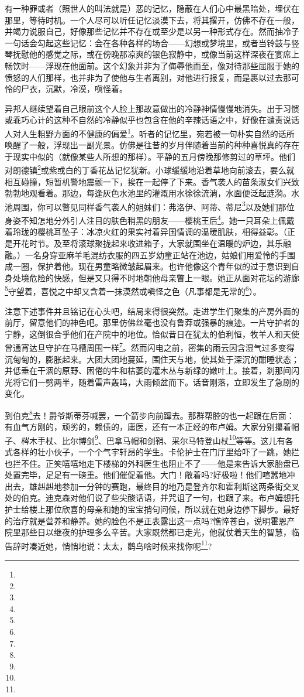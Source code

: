 \par 有一种罪或者（照世人的叫法就是）恶的记忆，隐蔽在人们心中最黑暗处，埋伏在那里，等待时机。一个人尽可以听任记忆淡漠下去，将其撂开，仿佛不存在一般，并竭力说服自己，好像那些记忆并不存在或至少是以另一种形式存在。然而抽冷子一句话会勾起这些记忆：会在各种各样的场合——幻想或梦境里，或者当铃鼓与竖琴抚慰他的感觉之际，或在傍晚那凉爽的银色寂静中，或像当前这样深夜在宴席上畅饮时——浮现在他面前。这个幻象并非为了侮辱他而至，像对待那些屈服于她的愤怒的人们那样，也并非为了使他与生者离别，对他进行报复，而是裹以过去那可怜的尸衣，沉默，冷漠，嗔怪着。
\par 异邦人继续望着自己眼前这个人脸上那故意做出的冷静神情慢慢地消失。出于习惯或乖巧心计的这种不自然的冷静似乎也包含在他的辛辣话语之中，好像在谴责说话人对人生粗野方面的不健康的偏爱\footnote{}。听者的记忆里，宛若被一句朴实自然的话所唤醒了一般，浮现出一副光景。仿佛是往昔的岁月伴随着当前的种种喜悦真的存在于现实中似的（就像某些人所想的那样）。平静的五月傍晚那修剪过的草坪。他们对朗德镇\footnote{}或紫或白的丁香花丛记忆犹新。小球缓缓地沿着草地向前滚去，要么就相互碰撞，短暂机警地震颤一下，挨在一起停了下来。香气袭人的苗条淑女们兴致勃勃地观看着。那边，每逢灰色水池里的灌溉用水徐徐流淌，水面便泛起涟漪。水池周围，你可以瞥见同样香气袭人的姐妹们：弗洛伊、阿蒂、蒂尼\footnote{}以及她们那位身姿不知怎地分外引人注目的肤色稍黑的朋友——樱桃王后\footnote{}。她一只耳朵上佩戴着玲珑的樱桃耳坠子：冰凉火红的果实衬着异国情调的温暖肌肤，相得益彰。（正是开花时节。及至将滚球聚拢起来收进箱子，大家就围坐在温暖的炉边，其乐融融。）一名身穿亚麻羊毛混纺衣服的四五岁幼童正站在池边，姑娘们用爱怜的手围成一圈，保护着他。现在男童略微皱起眉来。也许他像这个青年似的过于意识到自身处境危险的快感，但是又只得不时地朝他母亲瞥上一眼。她正从面对花坛的游廊\footnote{}守望着，喜悦之中却又含着一抹漠然或嗔怪之色（凡事都是无常的\footnote{}）。
\par 注意下述事件并且铭记在心头吧，结局来得很突然。走进学生们聚集的产房外面的前厅，留意他们的神色吧。那里仿佛丝毫也没有鲁莽或强暴的痕迹。一片守护者的宁静，这倒很合乎他们在产院中的地位。恰似昔日在犹太的伯利恒，牧羊人和天使曾通宵达旦守护在马槽周围一样\footnote{}。然而闪电之前，密集的雨云因含湿气过多变得沉甸甸的，膨胀起来。大团大团地蔓延，围住天与地，使其处于深沉的酣睡状态；并低垂在干涸的原野、困倦的牛和枯萎的灌木丛与新绿的嫩叶上。接着，刹那间闪光将它们一劈两半，随着雷声轰鸣，大雨倾盆而下。话音刚落，立即发生了急剧的变化。
\par 到伯克\footnote{}去！爵爷斯蒂芬喊罢，一个箭步向前蹿去。那群帮腔的也一起跟在后面：有血气方刚的，顽劣的，赖债的，庸医，还有一本正经的布卢姆。大家分别攥着帽子、梣木手杖、比尔博剑\footnote{}、巴拿马帽和剑鞘、采尔马特登山杖\footnote{}等等。这儿有各式各样的壮小伙子，一个个气宇轩昂的学生。卡伦护士在门厅里给吓了一跳，她拦也拦不住。正笑嘻嘻地走下楼梯的外科医生也阻止不了——他是来告诉大家胎盘已处置完毕，足足有一磅重。他们催促着他。大门！敞着吗?好极啦！他们喧嚣地冲出去，雄赳赳地参加一分钟的赛跑，最终目的地乃是登齐尔和霍利斯这两条街交叉处的伯克。迪克森对他们说了些尖酸话语，并咒诅了一句，也跟了来。布卢姆想托护士给楼上那位欣喜的母亲和她的宝宝捎句问候，所以就在她身边停下脚步。最好的治疗就是营养和静养。她的脸色不是正表露出这一点吗?憔悴苍白，说明霍恩产院里那些日以继夜的护理多么辛苦。大家既然都已走光，他就仗着天生的智慧，临告辞时凑近她，悄悄地说：太太，鹳鸟啥时候来找你呢\footnote{}?
